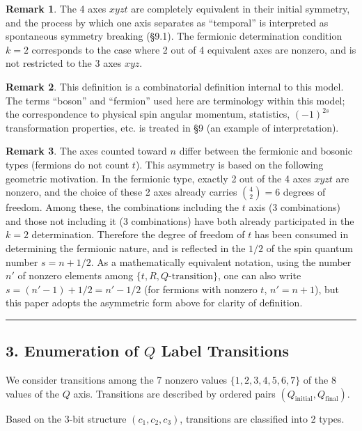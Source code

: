 \documentclass[
  a4paper,11pt]{article}
\theoremstyle{definition}
\theoremstyle{remark}
\begin{document}
\textbf{Remark 1}. The 4 axes \(xyzt\) are completely equivalent in
their initial symmetry, and the process by which one axis separates as
``temporal'' is interpreted as spontaneous symmetry breaking (§9.1). The
fermionic determination condition \(k = 2\) corresponds to the case
where 2 out of 4 equivalent axes are nonzero, and is not restricted to
the 3 axes \(xyz\).

\textbf{Remark 2}. This definition is a combinatorial definition
internal to this model. The terms ``boson'' and ``fermion'' used here
are terminology within this model; the correspondence to physical spin
angular momentum, statistics, \((-1)^{2s}\) transformation properties,
etc. is treated in §9 (an example of interpretation).

\textbf{Remark 3}. The axes counted toward \(n\) differ between the
fermionic and bosonic types (fermions do not count \(t\)). This
asymmetry is based on the following geometric motivation. In the
fermionic type, exactly 2 out of the 4 axes \(xyzt\) are nonzero, and
the choice of these 2 axes already carries \(\binom{4}{2} = 6\) degrees
of freedom. Among these, the combinations including the \(t\) axis (3
combinations) and those not including it (3 combinations) have both
already participated in the \(k = 2\) determination. Therefore the
degree of freedom of \(t\) has been consumed in determining the
fermionic nature, and is reflected in the \(1/2\) of the spin quantum
number \(s = n + 1/2\). As a mathematically equivalent notation, using
the number \(n'\) of nonzero elements among
\(\{t, R, Q\text{-transition}\}\), one can also write
\(s = (n' - 1) + 1/2 = n' - 1/2\) (for fermions with nonzero \(t\),
\(n' = n + 1\)), but this paper adopts the asymmetric form above for
clarity of definition.

\begin{center}\rule{0.5\linewidth}{0.5pt}\end{center}

\subsection{\texorpdfstring{3. Enumeration of \(Q\) Label
Transitions}{3. Enumeration of Q Label Transitions}}\label{enumeration-of-q-label-transitions}

We consider transitions among the 7 nonzero values
\(\{1, 2, 3, 4, 5, 6, 7\}\) of the 8 values of the \(Q\) axis.
Transitions are described by ordered pairs
\((Q_\text{initial}, Q_\text{final})\).

Based on the 3-bit structure \((c_1, c_2, c_3)\), transitions are
classified into 2 types.
\end{document}

